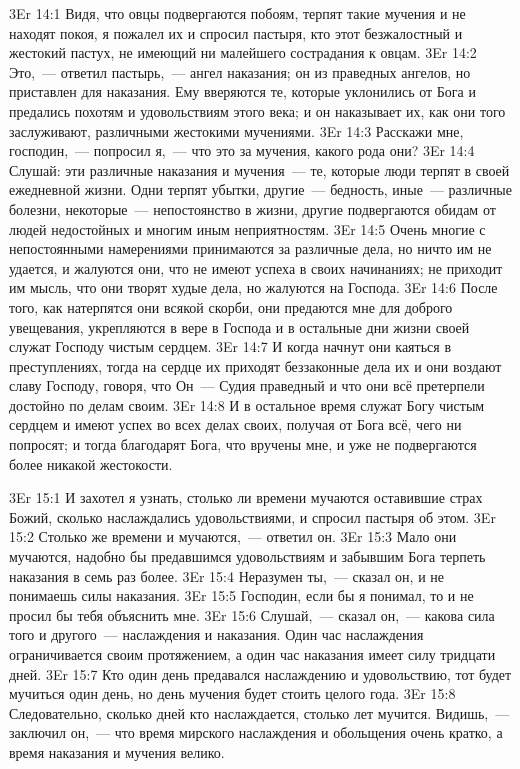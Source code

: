 \vs 3Er 14:1
Видя, что овцы
подвергаются побоям, терпят такие мучения и не находят покоя, я пожалел их и
спросил пастыря, кто этот безжалостный и жестокий пастух, не имеющий ни
малейшего сострадания к овцам.
\vs 3Er 14:2
Это,~--- ответил пастырь,~--- ангел наказания; он из праведных ангелов, но приставлен для наказания. Ему
вверяются те, которые уклонились от Бога и предались похотям и удовольствиям
этого века; и он наказывает их, как они того заслуживают, различными жестокими
мучениями.
\vs 3Er 14:3
Расскажи мне, господин,~---
попросил я,~--- что это за мучения, какого рода они?
\vs 3Er 14:4
Слушай: эти различные
наказания и мучения~--- те, которые люди терпят в своей ежедневной жизни. Одни
терпят убытки, другие~--- бедность, иные~--- различные болезни,
некоторые~--- непостоянство в жизни, другие подвергаются обидам от людей недостойных и
многим иным неприятностям.
\vs 3Er 14:5
Очень многие с
непостоянными намерениями принимаются за различные дела, но ничто им не
удается, и жалуются они, что не имеют успеха в своих начинаниях; не приходит
им мысль, что они творят худые дела, но жалуются на Господа.
\vs 3Er 14:6
После того, как натерпятся
они всякой скорби, они предаются мне для доброго увещевания, укрепляются в
вере в Господа и в остальные дни жизни своей служат Господу чистым сердцем.
\vs 3Er 14:7
И когда начнут они каяться
в преступлениях, тогда на сердце их приходят беззаконные дела их и они воздают
славу Господу, говоря, что Он~--- Судия праведный и что они всё претерпели
достойно по делам своим.
\vs 3Er 14:8
И в остальное время служат
Богу чистым сердцем и имеют успех во всех делах своих, получая от Бога всё,
чего ни попросят; и тогда благодарят Бога, что вручены мне, и уже не
подвергаются более никакой жестокости.

\vs 3Er 15:1
И захотел я узнать,
столько ли времени мучаются оставившие страх Божий, сколько наслаждались
удовольствиями, и спросил пастыря об этом.
\vs 3Er 15:2
Столько же времени и
мучаются,~--- ответил он.
\vs 3Er 15:3
Мало они мучаются, надобно
бы предавшимся удовольствиям и забывшим Бога терпеть наказания в семь раз
более.
\vs 3Er 15:4
Неразумен ты,~--- сказал он,
и не понимаешь силы наказания.
\vs 3Er 15:5
Господин, если бы я
понимал, то и не просил бы тебя объяснить мне.
\vs 3Er 15:6
Слушай,~--- сказал он,~--- какова сила того и другого~--- наслаждения и наказания. Один час наслаждения
ограничивается своим протяжением, а один час наказания имеет силу тридцати
дней.
\vs 3Er 15:7
Кто один день предавался
наслаждению и удовольствию, тот будет мучиться один день, но день мучения
будет стоить целого года.
\vs 3Er 15:8
Следовательно, сколько
дней кто наслаждается, столько лет мучится. Видишь,~--- заключил он,~--- что время
мирского наслаждения и обольщения очень кратко, а время наказания и мучения
велико.

